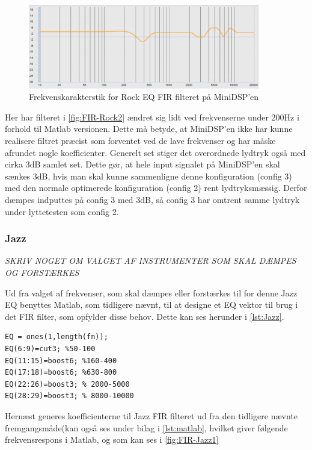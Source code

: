 \begin{figure}[H]
	\center
	\includegraphics[width=0.9\textwidth]{figur/FIR-Rock2}
	\caption{Frekvenskarakterstik for Rock EQ FIR filteret på MiniDSP'en}
	\label{fig:FIR-Rock2}
\end{figure}
 Her har filteret i \autoref{fig:FIR-Rock2} ændret sig lidt ved frekvenserne under 200Hz i forhold til Matlab versionen. Dette må betyde, at MiniDSP'en ikke har kunne realisere filtret præcist som forventet ved de lave frekvenser og har måske afrundet nogle koefficienter. Generelt set stiger det overordnede lydtryk også med cirka 3dB samlet set. Dette gør, at hele input signalet på MiniDSP'en skal sænkes 3dB, hvis man skal kunne sammenligne denne konfiguration (config 3) med den normale optimerede konfiguration (config 2) rent lydtryksmæssig. Derfor dæmpes indputtes på config 3 med 3dB, så config 3 har omtrent samme lydtryk under lyttetesten som config 2.  

\subsubsection{Jazz}

\textit{SKRIV NOGET OM VALGET AF INSTRUMENTER SOM SKAL DÆMPES OG FORSTÆRKES}


Ud fra valget af frekvenser, som skal dæmpes eller forstærkes til for denne Jazz EQ benyttes Matlab, som tidligere nævnt, til at designe et EQ vektor til brug i det FIR filter, som opfylder disse behov. Dette kan ses herunder i  \autoref{lst:Jazz}.   

\begin{lstlisting}[frame=single, caption={FIR EQ vektor Jazz kode},label={lst:Jazz},captionpos=b]
%% Jazz
EQ = ones(1,length(fn));
EQ(6:9)=cut3; %50-100 
EQ(11:15)=boost6; %160-400
EQ(17:18)=boost6; %630-800
EQ(22:26)=boost3; % 2000-5000
EQ(28:29)=boost3; % 8000-10000
\end{lstlisting} 
Hernæst generes koefficienterne til Jazz FIR filteret ud fra den tidligere nævnte fremgangsmåde(kan også ses under bilag i \autoref{lst:matlab}, hvilket giver følgende frekvensrespons i Matlab, og som kan ses i  \autoref{fig:FIR-Jazz1}

